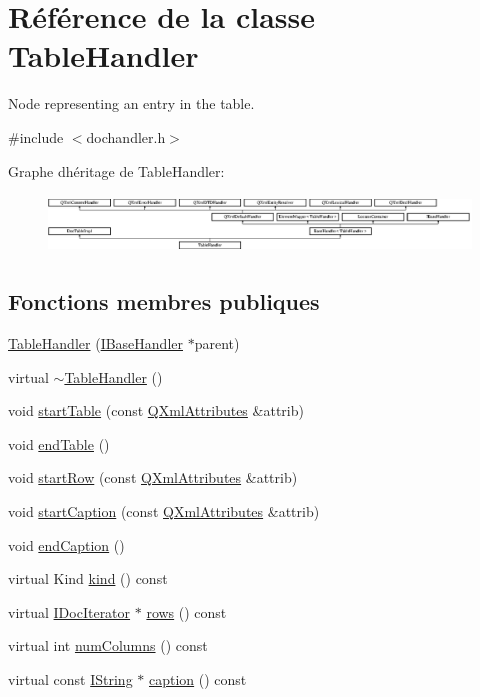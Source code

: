 \hypertarget{class_table_handler}{}\section{Référence de la classe Table\+Handler}
\label{class_table_handler}


Node representing an entry in the table.  




{\ttfamily \#include $<$dochandler.\+h$>$}

Graphe d\textquotesingle{}héritage de Table\+Handler\+:\begin{figure}[H]
\begin{center}
\leavevmode
\includegraphics[height=1.538461cm]{class_table_handler}
\end{center}
\end{figure}
\subsection*{Fonctions membres publiques}
\begin{DoxyCompactItemize}
\item 
\hyperlink{class_table_handler_a9e0613ea8ae5607d225932bcc9f62215}{Table\+Handler} (\hyperlink{class_i_base_handler}{I\+Base\+Handler} $\ast$parent)
\item 
virtual \hyperlink{class_table_handler_af9fedd38ed9ff9d9dbe89fc896ea7cbe}{$\sim$\+Table\+Handler} ()
\item 
void \hyperlink{class_table_handler_a09ce57d19969e097b1bd637923672003}{start\+Table} (const \hyperlink{class_q_xml_attributes}{Q\+Xml\+Attributes} \&attrib)
\item 
void \hyperlink{class_table_handler_ad906939d05d7140280515a0f2b0f0031}{end\+Table} ()
\item 
void \hyperlink{class_table_handler_a907149d6a57a20bbb142d60d457209fe}{start\+Row} (const \hyperlink{class_q_xml_attributes}{Q\+Xml\+Attributes} \&attrib)
\item 
void \hyperlink{class_table_handler_a8e3d08c867677c9e2d9bac9b53b781e2}{start\+Caption} (const \hyperlink{class_q_xml_attributes}{Q\+Xml\+Attributes} \&attrib)
\item 
void \hyperlink{class_table_handler_a2fb38f8951f0982bcd2a17d0d1a2182f}{end\+Caption} ()
\item 
virtual Kind \hyperlink{class_table_handler_a4cfaeef846b7947cad14fee44164986a}{kind} () const 
\item 
virtual \hyperlink{class_i_doc_iterator}{I\+Doc\+Iterator} $\ast$ \hyperlink{class_table_handler_aae0b7835560d333e88c056613ebf32c1}{rows} () const 
\item 
virtual int \hyperlink{class_table_handler_a39b0ac569b3b66f148c209ced5c4a45b}{num\+Columns} () const 
\item 
virtual const \hyperlink{class_i_string}{I\+String} $\ast$ \hyperlink{class_table_handler_aa76530a9277b9419e0ad632638b61432}{caption} () const 
\end{DoxyCompactItemize}
